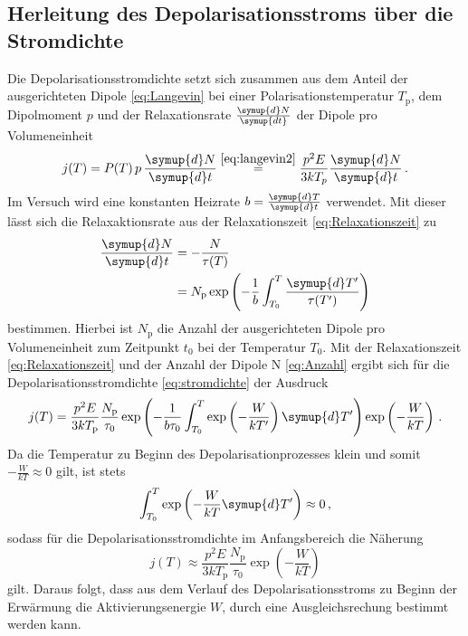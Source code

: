 \subsection{Herleitung des Depolarisationsstroms über die Stromdichte}
\label{sec:stromdichte}
Die Depolarisationsstromdichte setzt sich zusammen aus dem Anteil der ausgerichteten Dipole \eqref{eq:Langevin} bei einer Polarisationstemperatur $T_\text{p}$, dem Dipolmoment $p$ und der Relaxationsrate $\frac{\symup{d}N}{\symup{dt}}$ der Dipole pro Volumeneinheit
\begin{equation}
    j(T)=P(T)\, p \,\frac{\symup{d}N}{\symup{d}t} \stackrel{ \eqref{eq:langevin2} }{=} \frac{p^2 E}{3kT_p}\frac{\symup{d}N}{\symup{d}t} \, .
    \label{eq:stromdichte}
\end{equation}
Im Versuch wird eine konstanten Heizrate $b = \frac{\symup{d}T}{\symup{d}t}$ verwendet.
Mit dieser lässt sich die Relaxaktionsrate aus der Relaxationszeit \eqref{eq:Relaxationszeit} zu
\begin{align}
    \frac{\symup{d}N}{\symup{d}t} & = -\frac{N}{\tau(T)}\notag \\
    & = N_\text{p}\exp \left (-\frac{1}{b}\int_{T_0}^T \frac{\symup{d}T'}{\tau(T')} \right )
    \label{eq:Anzahl}
\end{align}
bestimmen.
Hierbei ist $N_\text{p}$ die Anzahl der ausgerichteten Dipole pro Volumeneinheit zum Zeitpunkt $t_0$ bei der Temperatur $T_0$.
Mit der Relaxationszeit \eqref{eq:Relaxationszeit} und der Anzahl der Dipole N \eqref{eq:Anzahl} ergibt sich für die Depolarisationsstromdichte \eqref{eq:stromdichte} der Ausdruck
\begin{equation}\label{eq:stromdichte2}
    j(T)= \frac{p^2E}{3kT_\text{p}}\frac{N_\text{p}}{\tau_0} \exp \left (-\frac{1}{b\tau_0}\int_{T_0}^T \exp \left (-\frac{W}{kT'} \right ) \symup{d}T'  \right ) \exp \left (-\frac{W}{kT} \right )\, .
\end{equation}
Da die Temperatur zu Beginn des Depolarisationprozesses klein und somit $-\frac{W}{kT}\approx 0$ gilt, ist stets
\begin{equation*}
    \int_{T_0}^T \exp \left (-\frac{W}{kT}\symup{d}T' \right ) \approx 0\, ,
\end{equation*}
sodass für die Depolarisationsstromdichte im Anfangsbereich die Näherung
\begin{equation}
    j(T) \approx \frac{p^2 E}{3kT_\text{p}}\frac{N_\text{p}}{\tau_0} \exp \left (-\frac{W}{kT} \right )
    \label{eq:anlauf}
\end{equation}
gilt.
Daraus folgt, dass aus dem Verlauf des Depolarisationsstroms zu Beginn der Erwärmung die Aktivierungsenergie $W$, durch eine Ausgleichsrechung bestimmt werden kann.